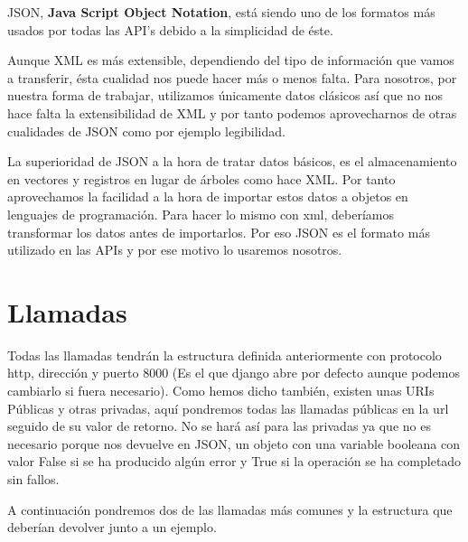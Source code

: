 JSON, \textbf{Java Script Object Notation}, está siendo uno de los formatos más usados por todas las API's debido a la simplicidad de éste.

Aunque XML es más extensible, dependiendo del tipo de información que vamos a transferir, ésta cualidad nos puede hacer más o menos falta. Para nosotros, por nuestra forma de trabajar, utilizamos únicamente datos clásicos así que no nos hace falta la extensibilidad de XML y por tanto podemos aprovecharnos de otras cualidades de JSON como por ejemplo legibilidad.

La superioridad de JSON a la hora de tratar datos básicos, es el almacenamiento en vectores y registros en lugar de árboles como hace XML. Por tanto aprovechamos la facilidad a la hora de importar estos datos a objetos en lenguajes de programación. Para hacer lo mismo con xml, deberíamos transformar los datos antes de importarlos. Por eso JSON es el formato más utilizado en las APIs y por ese motivo lo usaremos nosotros.


\section{Llamadas}

Todas las llamadas tendrán la estructura definida anteriormente con protocolo http, dirección y puerto 8000 (Es el que django abre por defecto aunque podemos cambiarlo si fuera necesario).
Como hemos dicho también, existen unas URIs Públicas y otras privadas, aquí pondremos todas las llamadas públicas en la url seguido de su valor de retorno. No se hará así para las privadas ya que no es necesario porque nos devuelve en JSON, un objeto con una variable booleana con valor False si se ha producido algún error y True si la operación se ha completado sin fallos.

A continuación pondremos dos de las llamadas más comunes y la estructura que deberían devolver junto a un ejemplo.



